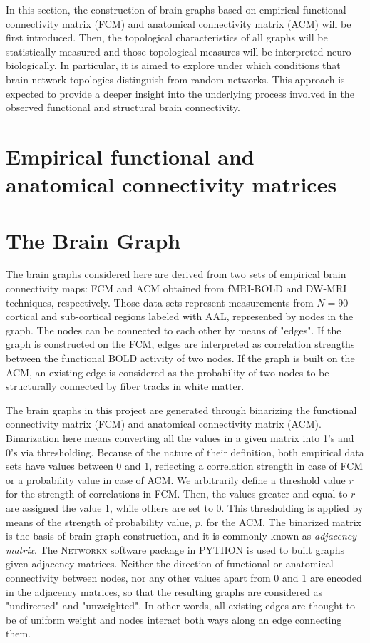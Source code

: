 In this section, the construction of brain graphs based on empirical functional connectivity matrix (FCM) and anatomical connectivity matrix (ACM) will be first introduced. Then, the topological characteristics of all graphs will be statistically measured and those topological measures will be interpreted neuro-biologically. In particular, it is aimed to explore under which conditions that brain network topologies distinguish from random networks. This approach is expected to provide a deeper insight into the underlying process involved in the observed functional and structural brain connectivity. 


\section{Empirical functional and anatomical connectivity matrices}


\section{The Brain Graph}

The brain graphs considered here are derived from two sets of empirical brain connectivity maps: FCM and ACM obtained from fMRI-BOLD and DW-MRI techniques, respectively. Those data sets represent measurements from $N=90$ cortical and sub-cortical regions labeled with AAL, represented by nodes in the graph. The nodes can be connected to each other by means of "edges". If the graph is constructed on the FCM, edges are interpreted as correlation strengths between the functional BOLD activity of two nodes. If the graph is built on the ACM, an existing edge is considered as the probability of two nodes to be structurally connected by fiber tracks in white matter.

The brain graphs in this project are generated through binarizing the functional connectivity matrix (FCM) and anatomical connectivity matrix (ACM). Binarization here means converting all the values in a given matrix into 1's and 0's via thresholding. Because of the nature of their definition, both empirical data sets have values between 0 and 1, reflecting a correlation strength in case of FCM or a probability value in case of ACM. We arbitrarily define a threshold value $r$ for the strength of correlations in FCM. Then, the values greater and equal to $r$ are assigned the value 1, while others are set to 0. This thresholding is applied by means of the strength of probability value, $p$, for the ACM. The binarized matrix is the basis of brain graph construction, and it is commonly known as \textit{adjacency matrix}. The \textsc{Networkx} software package in \textsc{PYTHON} is used to built graphs given adjacency matrices. Neither the direction of functional or anatomical connectivity between nodes, nor any other values apart from 0 and 1  are encoded in the adjacency matrices,  so that the resulting graphs are considered as "undirected" and "unweighted". In other words, all existing edges are thought to be of uniform weight and nodes interact both ways along an edge connecting them. 


